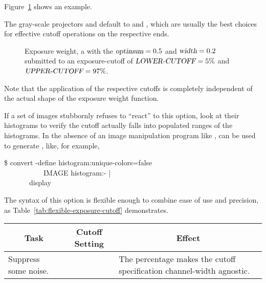 \begin{codelist}
  Figure~\ref{fig:exposure-cutoff} shows an example.

  The gray-scale projectors  and
   default to
   and
  , which
  are usually the best choices for effective cutoff operations on the
  respective ends.

  \begin{figure}
    \begin{maxipage}
      \centering
    \end{maxipage}

    \caption[Exposure cutoff function]{Exposure weight, a
       with the $\textsl{optimum} = 0.5$ and
      $\textsl{width} = 0.2$ submitted to an exposure-cutoff of
      $\textsl{LOWER-CUTOFF} = 5\%$ and $\textsl{UPPER-CUTOFF} =
      97\%$.\label{fig:exposure-cutoff}}
  \end{figure}

  Note that the application of the respective cutoffs is completely
  independent of the actual shape of the exposure weight function.

  If a set of images stubbornly refuses to ``react'' to this option,
  look at their histograms to verify the cutoff actually falls into
  populated ranges of the histograms.  In the absence of an image
  manipulation program like ,
   can be
  used to generate
  , like, for
  example,

  \begin{terminal}
    \$ convert -define histogram:unique-colors=false \bslash \\
    ~~~~~~~~~~~IMAGE histogram:- | \bslash \\
    ~~~~~~~display
  \end{terminal}

  The syntax of this option is flexible enough to combine ease of use
  and precision, as Table~\ref{tab:flexible-exposure-cutoff}
  demonstrates.

  \begin{table}[htbp]
    \begin{maxipage}
      \begin{tabular}{p{.3\linewidth}lp{.3\linewidth}}
        \hline
        \multicolumn{1}{c|}{Task} &
        \multicolumn{1}{c|}{Cutoff Setting} &
        \multicolumn{1}{c}{Effect} \\
        \hline\extraheadingsep
        Suppress some noise. & \option{--exposure-cutoff=5\%} & The
        percentage makes the cutoff specification channel-width
        agnostic. \\


\end{tabular}
\end{maxipage}
\end{table}
\end{codelist}
